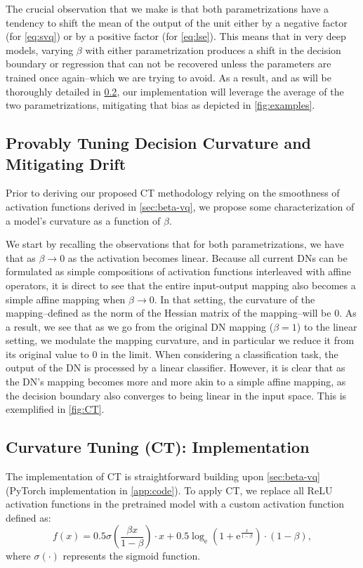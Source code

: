 The crucial observation that we make is that both parametrizations have a tendency to shift the mean of the output of the unit either by a negative factor (for \cref{eq:svq}) or by a positive factor (for \cref{eq:lse}). This means that in very deep models, varying $\beta$ with either parametrization produces a shift in the decision boundary or regression that can not be recovered unless the parameters are trained once again--which we are trying to avoid. As a result, and as will be thoroughly detailed in \cref{sec:ct-implement}, our implementation will leverage the average of the two parametrizations, mitigating that bias as depicted in \cref{fig:examples}.

\subsection{Provably Tuning Decision Curvature and Mitigating Drift}\label{sec:proof}


Prior to deriving our proposed CT methodology relying on the smoothness of activation functions derived in \cref{sec:beta-vq}, we propose some characterization of a model's curvature as a function of $\beta$.


We start by recalling the observations that for both parametrizations, we have that as $\beta \rightarrow 0$ as the activation becomes linear. Because all current DNs can be formulated as simple compositions of activation functions interleaved with affine operators, it is direct to see that the entire input-output mapping also becomes a simple affine mapping when $\beta \rightarrow 0$. In that setting, the curvature of the mapping--defined as the norm of the Hessian matrix of the mapping--will be $0$. As a result, we see that as we go from the original DN mapping ($\beta=1$) to the linear setting, we modulate the mapping curvature, and in particular we reduce it from its original value to $0$ in the limit. When considering a classification task, the output of the DN is processed by a linear classifier. However, it is clear that as the DN's mapping becomes more and more akin to a simple affine mapping, as the decision boundary also converges to being linear in the input space. This is exemplified in \cref{fig:CT}.


\subsection{Curvature Tuning (CT): Implementation}\label{sec:ct-implement}
The implementation of CT is straightforward building upon \cref{sec:beta-vq} (PyTorch implementation in \cref{app:code}). To apply CT, we replace all ReLU activation functions in the pretrained model with a custom activation function defined as:
\begin{equation}\label{eq:CT}
    f(x) = 0.5  \sigma\left(\frac{\beta x}{1 - \beta}\right) \cdot x + 0.5  \log_\mathrm{e}\left(1 + \mathrm{e}^{\frac{x}{1 - \beta}}\right) \cdot (1 - \beta),
\end{equation}
where  $\sigma(\cdot)$ represents the sigmoid function. 

